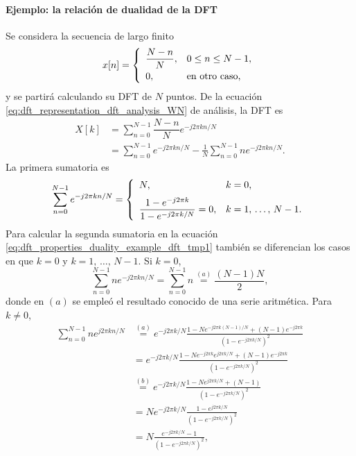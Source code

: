 \documentclass[a4paper]{report}
\begin{document}
\paragraph{Ejemplo: la relación de dualidad de la DFT} Se considera la secuencia de largo finito 
\begin{equation}\label{eq:dft_properties_duality_example_xn}
 x[n]=
 \left\{
 \begin{array}{ll}
  \dfrac{N-n}{N}, & 0\leq n\leq N-1,\\[\medskipamount]
  0, & \textrm{en otro caso,}
 \end{array}
 \right.   
\end{equation}
y se partirá calculando su DFT de \(N\) puntos. De la ecuación \ref{eq:dft_representation_dft_analysis_WN} de análisis, la DFT es
\begin{align}
 X[k]&=\sum_{n=0}^{N-1}\dfrac{N-n}{N}e^{-j2\pi kn/N}\nonumber\\
  &=\sum_{n=0}^{N-1}e^{-j2\pi kn/N}-\frac{1}{N}\sum_{n=0}^{N-1}ne^{-j2\pi kn/N}.\label{eq:dft_properties_duality_example_dft_tmp1}
\end{align}
La primera sumatoria es 
\begin{equation}\label{eq:dft_properties_duality_example_dft_tmp5}
 \sum_{n=0}^{N-1}e^{-j2\pi kn/N}=
 \left\{
 \begin{array}{ll}
  N, & k=0,\\[\medskipamount]
  \dfrac{1-e^{-j2\pi k}}{1-e^{-j2\pi k/N}}=0, & k=1,\,\dots,\,N-1.
 \end{array}
 \right.   
\end{equation}
Para calcular la segunda sumatoria en la ecuación \ref{eq:dft_properties_duality_example_dft_tmp1} también se diferencian los casos en que \(k=0\) y \(k=1,\,\dots,\,N-1\). Si \(k=0\),
\begin{equation}\label{eq:dft_properties_duality_example_dft_tmp2}
 \sum_{n=0}^{N-1}ne^{-j2\pi kn/N}=\sum_{n=0}^{N-1}n\overset{(a)}{=}\frac{(N-1)N}{2}, 
\end{equation}
donde en \((a)\) se empleó el resultado conocido de una serie aritmética. Para \(k\neq0\),
\begin{align*}
 \sum_{n=0}^{N-1}ne^{j2\pi kn/N}&\overset{(a)}{=}e^{-j2\pi k/N}\frac{1-Ne^{-j2\pi k(N-1)/N}+(N-1)e^{-j2\pi k}}{(1-e^{-j2\pi k/N})^2}\\
  &=e^{-j2\pi k/N}\frac{1-Ne^{-j2\pi k}e^{j2\pi k/N}+(N-1)e^{-j2\pi k}}{(1-e^{-j2\pi k/N})^2}\\
  &\overset{(b)}{=}e^{-j2\pi k/N}\frac{1-Ne^{j2\pi k/N}+(N-1)}{(1-e^{-j2\pi k/N})^2}\\
  &=Ne^{-j2\pi k/N}\frac{1-e^{j2\pi k/N}}{(1-e^{-j2\pi k/N})^2}\\
  &=N\frac{e^{-j2\pi k/N}-1}{(1-e^{-j2\pi k/N})^2},
\end{align*}
\end{document}
